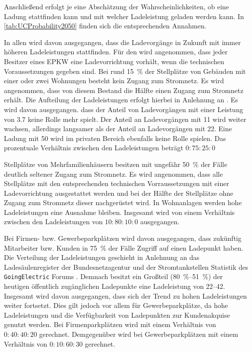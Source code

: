 Anschließend erfolgt je \UC eine Abschätzung der Wahrscheinlichkeiten, ob eine Ladung stattfinden kann und mit welcher Ladeleistung geladen werden kann.
In \autoref{tab:UCProbability2050} finden sich die entsprechenden Annahmen.



In allen \UCs wird davon ausgegangen, dass die Ladevorgänge in Zukunft mit immer höheren Ladeleistungen stattfinden.
Für den \UC \Eigenheim wird angenommen, dass jeder Besitzer eines \gls{EPKW} eine Ladevorrichtung vorhält, wenn die technischen Voraussetzungen gegeben sind.
Bei rund \SI{15}{\percent} der Stellplätze von Gebäuden mit einer oder zwei Wohnungen besteht kein Zugang zum Stromnetz. \cite{dena2020}
Es wird angenommen, dass von diesem Bestand die Hälfte einen Zugang zum Stromnetz erhält.
Die Aufteilung der Ladeleistungen erfolgt hierbei in Anlehnung an \cite{NPZMAVE2020}.
Es wird davon ausgegangen. dass der Anteil von Ladevorgängen mit einer Leistung von \SI{3.7}{\kw} keine Rolle mehr spielt.
Der Anteil an Ladevorgängen mit \SI{11}{\kw} wird weiter wachsen, allerdings langsamer als der Anteil an Ladevorgängen mit \SI{22}{\kw}.
Eine Ladung mit \SI{50}{\kw} wird im privaten Bereich ebenfalls keine Rolle spielen.
Das prozentuale Verhältnis zwischen den Ladeleistungen beträgt \(0:75:25:0\)\medskip

Stellplätze von Mehrfamilienhäusern besitzen mit ungefähr \SI{50}{\percent} der Fälle deutlich seltener Zugang zum Stromnetz. \cite{dena2020}
Es wird angenommen, dass alle Stellplätze mit den entsprechenden technischen Vorraussetzungen mit einer Ladevorrichtung ausgestattet werden und bei der Hälfte der Stellplätze ohne Zugang zum Stromnetz dieser nachgerüstet wird.
In Wohnanlagen werden hohe Ladeleistungen eine Ausnahme bleiben.
Insgesamt wird von einem Verhältnis zwischen den Ladeleistungen von \(10:80:10:0\) ausgegangen.\medskip

Bei Firmen- bzw. Gewerbeparkplätzen wird davon ausgegangen, dass zukünftig Mitarbeiter bzw. Kunden in \SI{75}{\percent} der Fälle Zugriff auf einen Ladepunkt haben.
Die Verteilung der Ladeleistungen geschieht in Anlehnung an das Ladesäulenregister der Bundesnetzagentur \cite[][Stand: ]{BundesnetzagenturElektrizitaet2020} und der Stromtankstellen Statistik des \texttt{GoingElectric} Forums \cite[][Stand: ]{Weemaes2020}.
Demnach besitzt ein Großteil (\SIrange[range-phrase=~bzw.~]{80}{51}{\percent}) der heutigen öffentlich zugänglichen Ladepunkte eine Ladeleistung von \SIrange{22}{42}{\kw}.
Insgesamt wird davon ausgegangen, dass sich der Trend zu hohen Ladeleistungen weiter fortsetzt.
Dies gilt jedoch vor allem für Gewerbeparkplätze, da hohe Ladeleistungen und die Verfügbarkeit von Ladepunkten zur Kundenakquise genutzt werden.
Bei Firmenparkplätzen wird mit einem Verhältnis von \(0:40:40:20\) gerechnet.
Demgegenüber wird bei Gewerbeparkplätzen mit einem Verhältnis von \(0:10:60:30\) gerechnet.\medskip

